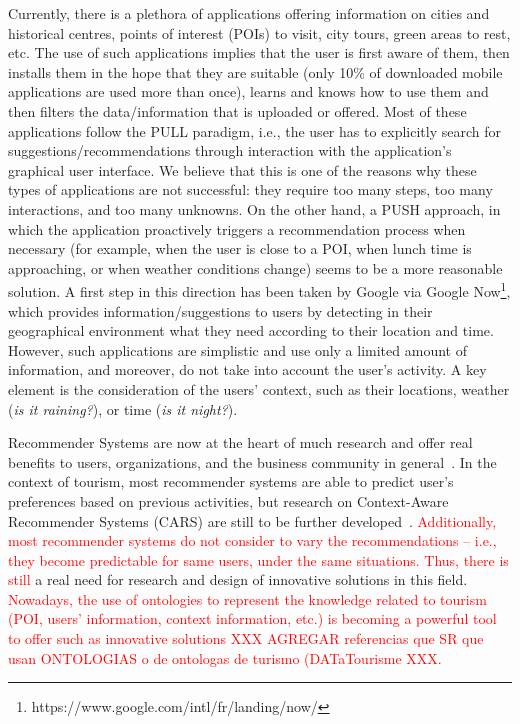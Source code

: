 
Currently, there is a plethora of applications offering information on cities and historical centres, points of interest (POIs) to visit, city tours, green areas to rest, etc. The use of such applications implies that the user is first aware of them, then installs them in the hope that they are suitable (only 10\% of downloaded mobile applications are used more than once), learns and knows how
to use them and then filters the data/information that is uploaded or offered. Most of these
applications follow the PULL paradigm, i.e., the user has to explicitly search for
suggestions/recommendations through interaction with the application’s graphical user interface.
We believe that this is one of the reasons why these types of applications are not successful: they
require too many steps, too many interactions, and too many unknowns. On the other hand, a
PUSH approach, in which the application proactively triggers a recommendation process when
necessary (for example, when the user is close to a POI, when lunch time is approaching, or
when weather conditions change) seems to be a more reasonable solution. A first step in this
direction has been taken by Google via Google Now\footnote{https://www.google.com/intl/fr/landing/now/}, 
which provides information/suggestions
to users by detecting in their geographical environment what they need according to their
location and time. However, such applications are simplistic and use only a limited amount of
information, and moreover, do not take into account the user’s activity. A key element is the
consideration of the users' context, such as their locations, weather (\textit{is it raining?}), or time (\textit{is it night?}).

Recommender Systems are now at the heart of
much research and offer real benefits to users, organizations, and the business community in
general~\cite{borras2014intelligent,del2016pull,leskovec2020mining}. In the context of tourism, most recommender systems are able to predict user's preferences based on previous activities, but research on Context-Aware Recommender Systems
(CARS) are still to
be further developed~\cite{adomavicius2011context,nejma2015service,haruna2017context,raza2019progress}. \textcolor{red}{Additionally, most recommender systems do not consider to vary the recommendations -- i.e., they become predictable  for same users, under the same situations. Thus, there is still} a real need for research and design of innovative solutions in this field. \textcolor{red}{Nowadays, the use of ontologies to represent the knowledge related to tourism (POI, users' information, context information, etc.) is becoming a powerful tool to offer such as innovative solutions XXX AGREGAR referencias que SR que usan ONTOLOGIAS o de ontologas de turismo (DATaTourisme XXX.}



